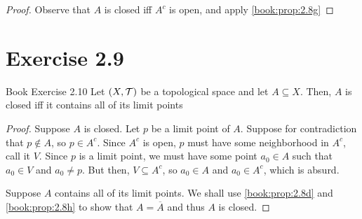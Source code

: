 \documentclass{article}
\begin{document}
\begin{proof}
    Observe that $A$ is closed iff $A^c$ is open, and apply \cref{book:prop:2.8g}
\end{proof}

\section{Exercise 2.9}

\begin{proposition}{Book Exercise 2.10}
\label{book:ex:2.10}
    Let $(X, \mathcal{T})$ be a topological space and let $A \subseteq X$. Then, $A$ is closed
    iff it contains all of its limit points
\end{proposition}
\begin{proof}
    \forwarddir Suppose $A$ is closed. Let $p$ be a limit point of $A$.
    Suppose for contradiction that $p \notin A$, so $p \in A^c$.
    Since $A^c$ is open, $p$ must have some neighborhood in $A^c$,
    call it $V$. Since $p$ is a limit point, we must have some point $a_0 \in A$ such
    that $a_0 \in V$ and $a_0 \neq p$. 
    But then, $V \subseteq A^c$, so $a_0 \in A$ and $a_0 \in A^c$, which is absurd.

    Suppose $A$ contains all of its limit points. We shall use \cref{book:prop:2.8d} and
    \cref{book:prop:2.8h} to show that $A=\overline{A}$ and thus $A$ is closed.
    
    
\end{proof}
\end{document}
